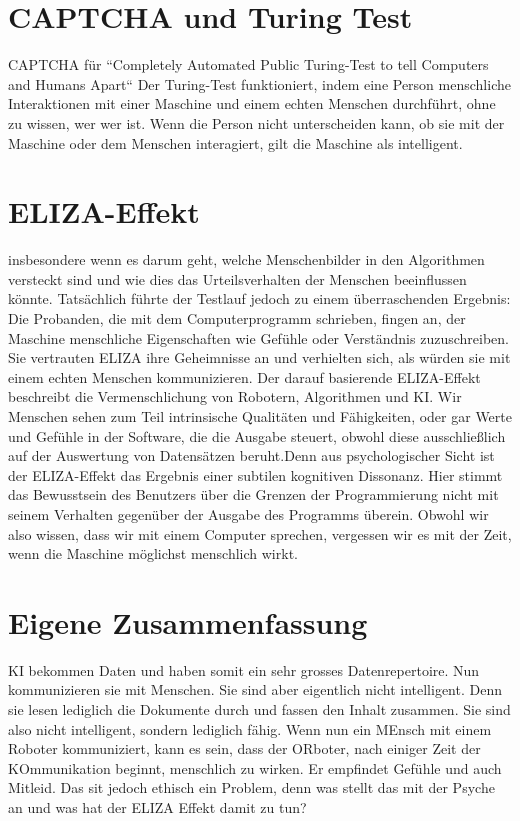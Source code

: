 \documentclass{article}
\begin{document}
   \section{CAPTCHA und Turing Test}
   CAPTCHA für “Completely Automated Public Turing-Test to tell Computers and Humans Apart“ Der Turing-Test funktioniert, indem eine Person menschliche Interaktionen mit einer Maschine und einem echten Menschen durchführt, ohne zu wissen, wer wer ist. Wenn die Person nicht unterscheiden kann, ob sie mit der Maschine oder dem Menschen interagiert, gilt die Maschine als intelligent. 
   
   \section{ ELIZA-Effekt}
   insbesondere wenn es darum geht, welche Menschenbilder in den Algorithmen versteckt sind und wie dies das Urteilsverhalten der Menschen beeinflussen könnte. Tatsächlich führte der Testlauf jedoch zu einem überraschenden Ergebnis: Die Probanden, die mit dem Computerprogramm schrieben, fingen an, der Maschine menschliche Eigenschaften wie Gefühle oder Verständnis zuzuschreiben. Sie vertrauten ELIZA ihre Geheimnisse an und verhielten sich, als würden sie mit einem echten Menschen kommunizieren. Der darauf basierende ELIZA-Effekt beschreibt die Vermenschlichung von Robotern, Algorithmen und KI. Wir Menschen sehen zum Teil intrinsische Qualitäten und Fähigkeiten, oder gar Werte und Gefühle in der Software, die die Ausgabe steuert, obwohl diese ausschließlich auf der Auswertung von Datensätzen beruht.Denn aus psychologischer Sicht ist der ELIZA-Effekt das Ergebnis einer subtilen kognitiven Dissonanz. Hier stimmt das Bewusstsein des Benutzers über die Grenzen der Programmierung nicht mit seinem Verhalten gegenüber der Ausgabe des Programms überein. Obwohl wir also wissen, dass wir mit einem Computer sprechen, vergessen wir es mit der Zeit, wenn die Maschine möglichst menschlich wirkt. 

    \section{Eigene Zusammenfassung}
    KI bekommen Daten und haben somit ein sehr grosses Datenrepertoire. Nun kommunizieren sie mit Menschen. Sie sind aber eigentlich nicht intelligent. Denn sie lesen lediglich die Dokumente durch und fassen den Inhalt zusammen. Sie sind also nicht intelligent, sondern lediglich fähig. Wenn nun ein MEnsch mit einem Roboter kommuniziert, kann es sein, dass der ORboter, nach einiger Zeit der KOmmunikation beginnt, menschlich zu wirken. Er empfindet Gefühle und auch Mitleid. Das sit jedoch ethisch ein Problem, denn was stellt das mit der Psyche an und was hat der ELIZA Effekt damit zu tun?
\end{document}
